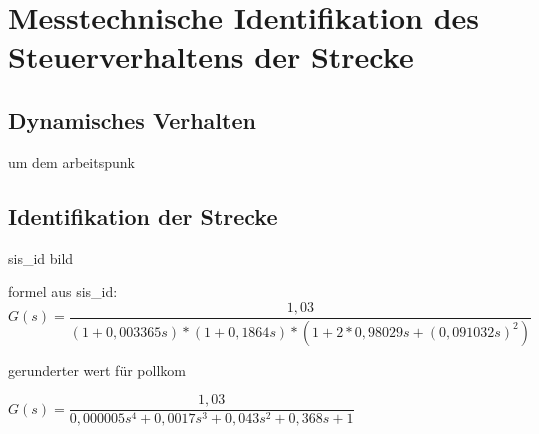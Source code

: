 
\newpage
[Perkowski]
\section{Messtechnische Identifikation des Steuerverhaltens der Strecke}


\subsection{Dynamisches Verhalten}
um dem arbeitspunk

\subsection{Identifikation der Strecke}

sis\_id bild


formel aus sis\_id: \\

$ G(s) = \dfrac{1,03}{(1 + 0,003365s) * (1 + 0,1864s) * (1 + 2*0,98029s + (0,091032s)^{2}) }$

gerunderter wert für pollkom

$ G(s) =  \dfrac{1,03}{0,000005s^{4} + 0,0017s^{3	} + 0,043s^{2} + 0,368s + 1 } $
